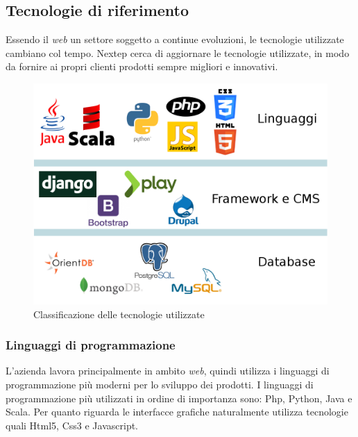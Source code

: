 \subsection{Tecnologie di riferimento}
Essendo il \emph{web} un settore soggetto a continue evoluzioni, le tecnologie utilizzate cambiano col tempo. Nextep cerca di aggiornare le tecnologie utilizzate, in modo da fornire ai propri clienti prodotti sempre migliori e innovativi.
\begin{figure}[h]
\centering
\includegraphics[scale=0.35]{immagini/tecnologie}
\caption{Classificazione delle tecnologie utilizzate}
\label{fig:tecnologie-utilizzate}
\end{figure}

\subsubsection{Linguaggi di programmazione}
L'azienda lavora principalmente in ambito \emph{web}, quindi utilizza i linguaggi di programmazione più moderni per lo sviluppo dei prodotti. I linguaggi di programmazione più utilizzati in ordine di importanza sono: Php, Python, Java e Scala. Per quanto riguarda le interfacce grafiche naturalmente utilizza tecnologie quali Html5, Css3 e Javascript.


